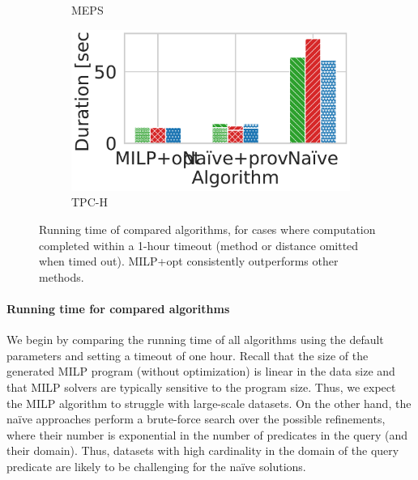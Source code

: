 \begin{figure}[t]
\begin{subfigure}{.35\textwidth}
      \caption{MEPS}
      \label{fig:meps_method}
    \end{subfigure}%
    \begin{subfigure}{.35\textwidth}
      \centering
      \includegraphics[width=.75\linewidth]{figures/tpch_method.pdf}
      \caption{TPC-H}
      \label{fig:r4}
    \end{subfigure}
    \caption{Running time of compared algorithms, for cases where computation completed within a 1-hour timeout (method or distance omitted when timed out).  MILP+opt consistently outperforms other methods.}
    \label{fig:time_vs_method}
\end{figure}
\paragraph*{\textbf{Running time for compared algorithms}}
We begin by comparing the running time of all algorithms using the default parameters and setting a timeout of one hour. 
Recall that the size of the generated MILP program (without optimization) is linear in the data size and that MILP solvers are typically sensitive to the program size. Thus, we expect the MILP algorithm to struggle with large-scale datasets. On the other hand, the na\"{i}ve approaches perform a brute-force search over the possible refinements, where their number is exponential in the number of predicates in the query (and their domain). Thus, datasets with high cardinality in the domain of the query predicate are likely to be challenging for the na\"{i}ve solutions.  

